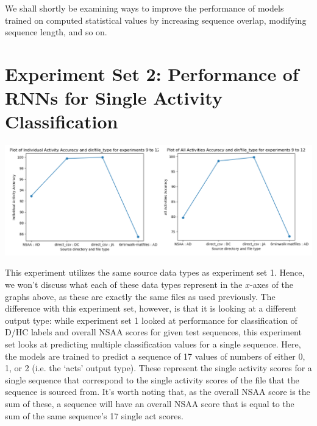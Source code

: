 \documentclass[12pt,twoside]{report}
\begin{document}
\quad We shall shortly be examining ways to improve the performance of models trained on computed statistical values by increasing sequence overlap, modifying sequence length, and so on.




\section{Experiment Set 2: Performance of RNNs for Single Activity Classification}

\begin{center}
\includegraphics[scale=0.4]{project_figures/fig10_8}
\end{center}

\quad This experiment utilizes the same source data types as experiment set 1. Hence, we won’t discuss what each of these data types represent in the $x$-axes of the graphs above, as these are exactly the same files as used previously. The difference with this experiment set, however, is that it is looking at a different output type: while experiment set 1 looked at performance for classification of D/HC labels and overall NSAA scores for given test sequences, this experiment set looks at predicting multiple classification values for a single sequence. Here, the models are trained to predict a sequence of 17 values of numbers of either 0, 1, or 2 (i.e. the ‘acts’ output type). These represent the single activity scores for a single sequence that correspond to the single activity scores of the file that the sequence is sourced from. It’s worth noting that, as the overall NSAA score is the sum of these, a sequence will have an overall NSAA score that is equal to the sum of the same sequence’s 17 single act scores.\\
\end{document}
